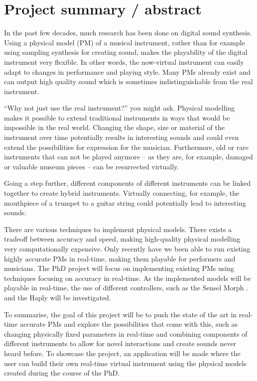 \section{Project summary / abstract}

In the past few decades, much research has been done on digital sound synthesis. Using a physical model (PM) of a musical instrument, rather than for example using sampling synthesis for creating sound, makes the playability of the digital instrument very flexible. In other words, the now-virtual instrument can easily adapt to changes in performance and playing style. Many PMs already exist and can output high quality sound which is sometimes indistinguishable from the real instrument.

“Why not just use the real instrument?” you might ask. Physical modelling makes it possible to extend traditional instruments in ways that would be impossible in  the real world. Changing the shape, size or material of the instrument over time potentially results in interesting sounds and could even extend the possibilities for expression for the musician. Furthermore, old or rare instruments that can not be played anymore -- as they are, for example, damaged or valuable museum pieces -- can be resurrected virtually.

Going a step further, different components of different instruments can be linked together to create hybrid instruments. Virtually connecting, for example, the mouthpiece of a trumpet to a guitar string could potentially lead to interesting sounds.

There are various techniques to implement physical models. There exists a tradeoff between accuracy and speed, making high-quality physical modelling very computationally expensive. Only recently have we been able to run existing highly accurate PMs in real-time, making them playable for performers and musicians. The PhD project will focus on implementing existing PMs using techniques focusing on accuracy in real-time. As the implemented models will be playable in real-time, the use of different controllers, such as the Sensel Morph \cite{Sensel2019}. and the Haply \cite{Haply2019} will be investigated.

To summarise, the goal of this project will be to push the state of the art in real-time accurate PMs and explore the possibilities that come with this, such as changing physically fixed parameters in real-time and combining components of different instruments to allow for novel interactions and create sounds never heard before. To showcase the project, an application will be made where the user can build their own real-time virtual instrument using the physical models created during the course of the PhD. 

